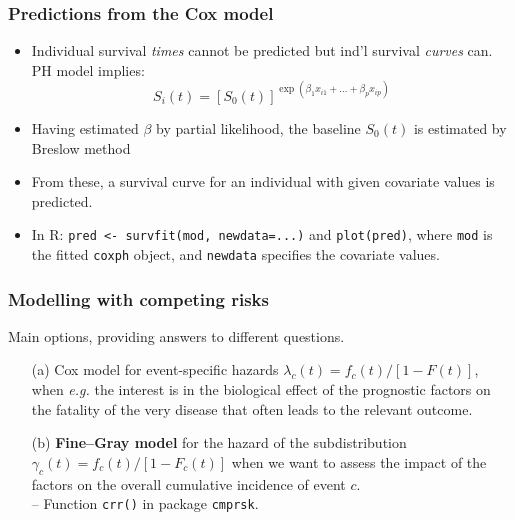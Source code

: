 \documentclass[handout,12pt,dvipsnames,t]{beamer}
\begin{document}
\begin{frame}[fragile]
\frametitle{Predictions from the Cox model}
\begin{itemize}
\item
Individual survival \textit{times} cannot be predicted
but ind'l survival \emph{curves} can.
PH model implies:
\[
S_i(t) = [S_0(t) ]^{\exp(\beta_1 x_{i1} +\ldots+\beta_p x_{ip})}
\]
\item
Having  estimated $\beta$ by partial likelihood, 
the baseline $S_0(t)$ is estimated by Breslow method 
\item 
\medskip
 From these, a survival curve for an individual
with given covariate values is predicted.
\item
\medskip
In R: 
\texttt{pred <- survfit(mod, newdata=...)} 
and \texttt{plot(pred)}, where \texttt{mod} is the fitted
\texttt{coxph} object, 
and \texttt{newdata}  
specifies the covariate values.
\end{itemize}
\end{frame}

\begin{frame}
\frametitle{Modelling with competing risks}

Main options, providing answers to different questions.

\begin{itemize}
\item[(a)]
  Cox model for event-specific hazards $\lambda_c(t) = f_c(t)/[1-F(t)]$, when \textit{e.g.} the interest is in the biological effect of the prognostic factors on the fatality of the very disease that often leads to the relevant outcome.  
  \bigskip 
\item[(b)]
 \textbf{Fine--Gray model} for the hazard  of the subdistribution $\gamma_c(t) = f_c(t)/[1-F_c(t)]$ 
  when we want to assess the impact of the factors on the overall cumulative incidence of event $c$.  \\
  -- Function \texttt{crr()} in package \texttt{cmprsk}. 
\end{itemize}

\end{frame}
\end{document}
